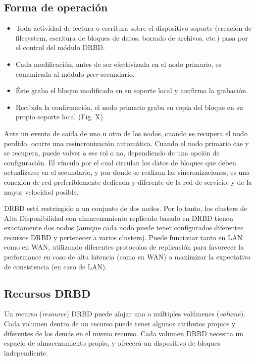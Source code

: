 \subsection{Forma de operación}
\begin{itemize}
	\item Toda actividad de lectura o escritura sobre el dispositivo soporte (creación de filesystem, escritura de bloques de datos, borrado de archivos, etc.) pasa por el control del módulo DRBD. 	
	\item Cada modificación, antes de ser efectivizada en el nodo primario, es comunicada al módulo \textit{peer} secundario. 	
	\item Éste graba el bloque modificado en su soporte local y confirma la grabación. 	
	\item Recibida la confirmación, el nodo primario graba su copia del bloque en su propio soporte local (Fig. X). %
\end{itemize} 

Ante un evento de caída de uno u otro de los nodos, cuando se recupera el nodo perdido, ocurre una resincronización automática. Cuando el nodo primario cae y se recupera, puede volver a ese rol o no, dependiendo de una opción de configuración. El vínculo por el cual circulan los datos de bloques que deben actualizarse en el secundario, y por donde se realizan las sincronizaciones, es una conexión de red  preferiblemente dedicada y diferente de la red de servicio, y de la mayor velocidad posible. 

DRBD está restringido a un conjunto de dos nodos. Por lo tanto, los clusters de Alta Disponibilidad con almacenamiento replicado basado en DRBD tienen exactamente dos nodos (aunque cada nodo puede tener configurados diferentes recursos DRBD y pertenecer a varios clusters). Puede funcionar tanto en LAN como en WAN, utilizando diferentes protocolos de replicación para favorecer la performance en caso de alta latencia (como en WAN) o maximizar la expectativa de consistencia (en caso de LAN). 

\subsection{Recursos DRBD}
Un recurso (\textit{resource}) DRBD puede alojar uno o múltiples volúmenes (\textit{volume}). Cada volumen dentro de un recurso puede tener algunos atributos propios y diferentes de los demás en el mismo recurso. Cada volumen DRBD necesita un espacio de almacenamiento propio, y ofrecerá un dispositivo de bloques independiente.
    

